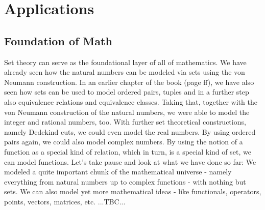





\section{Applications}

\subsection{Foundation of Math}
Set theory can serve as the foundational layer of all of mathematics. We have already seen how the natural numbers can be modeled via sets using the von Neumann construction. In an earlier chapter of the book (page \pageref{Sec:NaiveSetTheory} ff), we have also seen how sets can be used to model ordered pairs, tuples and in a further step also equivalence relations and equivalence classes. Taking that, together with the von Neumann construction of the natural numbers, we were able to model the integer and rational numbers, too. With further set theoretical constructions, namely Dedekind cuts, we could even model the real numbers. By using ordered pairs again, we could also model complex numbers. By using the notion of a function as a special kind of relation, which in turn, is a special kind of set, we can model functions. Let's take pause and look at what we have done so far: We modeled a quite important chunk of the mathematical universe - namely everything from natural numbers up to complex functions - with nothing but sets. We can also model yet more mathematical ideas - like functionals, operators, points, vectors, matrices, etc. ...TBC...



